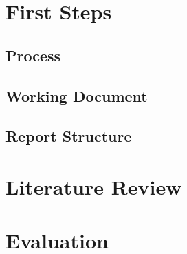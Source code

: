 \documentclass[a4paper]{memoir}
\begin{document}
\chapter{First Steps}

\section{Process}

\section{Working Document}

\section{Report Structure}

\chapter{Literature Review}

\chapter{Evaluation}
\end{document}
